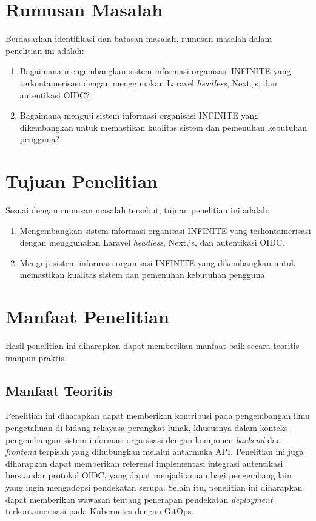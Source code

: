 \section{Rumusan Masalah}
Berdasarkan identifikasi dan batasan masalah, rumusan masalah dalam penelitian ini adalah:
\begin{enumerate}
	\item Bagaimana mengembangkan sistem informasi organisasi INFINITE yang terkontainerisasi dengan menggunakan Laravel \textit{headless}, Next.js, dan autentikasi OIDC?
	\item Bagaimana menguji sistem informasi organisasi INFINITE yang dikembangkan untuk memastikan kualitas sistem dan pemenuhan kebutuhan pengguna?
\end{enumerate}

\section{Tujuan Penelitian}
Sesuai dengan rumusan masalah tersebut, tujuan penelitian ini adalah:
\begin{enumerate}
	\item Mengembangkan sistem informasi organisasi INFINITE yang terkontainerisasi dengan menggunakan Laravel \textit{headless}, Next.js, dan autentikasi OIDC.
	\item Menguji sistem informasi organisasi INFINITE yang dikembangkan untuk memastikan kualitas sistem dan pemenuhan kebutuhan pengguna.
\end{enumerate}

\section{Manfaat Penelitian}

Hasil penelitian ini diharapkan dapat memberikan manfaat baik secara teoritis maupun praktis.

\subsection{Manfaat Teoritis}

Penelitian ini diharapkan dapat memberikan kontribusi pada pengembangan ilmu pengetahuan di bidang rekayasa perangkat lunak, khususnya dalam konteks pengembangan sistem informasi organisasi dengan komponen \textit{backend} dan \textit{frontend} terpisah yang dihubungkan melalui antarmuka API. Penelitian ini juga diharapkan dapat memberikan referensi implementasi integrasi autentikasi berstandar protokol OIDC, yang dapat menjadi acuan bagi pengembang lain yang ingin mengadopsi pendekatan serupa. Selain itu, penelitian ini diharapkan dapat memberikan wawasan tentang penerapan pendekatan \textit{deployment} terkontainerisasi pada Kubernetes dengan GitOps.

